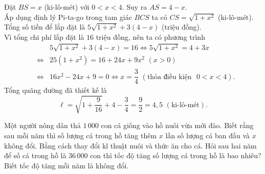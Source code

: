\begin{bt}
{\begin{center}
		\end{center}
		Đặt $BS=x$ (ki-lô-mét) với $0<x<4$. Suy ra $AS=4-x$.\\
		Áp dụng định lý Pi-ta-go trong tam giác $BCS$ ta có $CS=\sqrt{1+x^2}$ (ki-lô-mét).\\
		Tổng số tiền để lắp đặt là $5\sqrt{1+x^2}+3(4-x)$ (triệu đồng).\\
		Vì tổng chi phí lắp đặt là $16$ triệu đồng, nên ta có phương trình
		\begin{eqnarray*}
			&& 5\sqrt{1+x^2}+3(4-x)=16\Leftrightarrow 5\sqrt{1+x^2}=4+3x \\
			&\Leftrightarrow & 25(1+x^2)=16+24x+9x^2 \,\,(x>0)\\
			&\Leftrightarrow & 16x^2-24x+9=0\Leftrightarrow x=\dfrac{3}{4}\,\,(\text{thỏa điều kiện }\,\,0<x<4).
		\end{eqnarray*}
		Tổng quãng đường đã thiết kế là 
		\[\ell=\sqrt{1+\dfrac{9}{16}}+4-\dfrac{3}{4}=\dfrac{9}{2}=4{,}5\,\,(\text{ki-lô-mét}).\]
	}
 
\end{bt}

\begin{bt}%
Một người nông dân thả $1\,000$ con cá giống vào hồ nuôi vừa mới đào. Biết rằng sau mỗi năm thì số lượng cá trong hồ tăng thêm $x$ lần số lượng cá ban đầu và $x$ không đổi.  Bằng cách thay đổi kĩ thuật nuôi và thức ăn cho cá. Hỏi sau hai năm để số cá trong hồ là $36\,000$ con thì tốc độ tăng số lượng cá trong hồ là bao nhiêu? Biết tốc độ tăng mỗi năm là không đổi. 
\end{bt}

